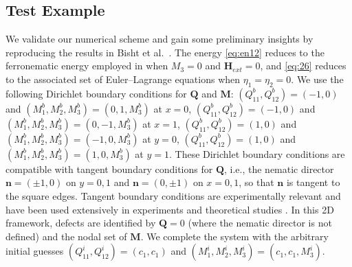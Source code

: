 \documentclass{article}
\def\Qvec{\mathbf{Q}}
\def \Mvec{\mathbf{M}}
\def\nvec{\mathbf{n}}
\def\Hvec{\mathbf{H}}
\begin{document}
\subsection{Test Example}\label{sec:test}

We validate our numerical scheme and gain some preliminary insights by reproducing the results in Bisht et al.\ \cite{Bisht2020}. The energy \eqref{eq:en12} reduces to the ferronematic energy employed in \cite{Bisht2020} when $M_3 = 0$ and $\Hvec_{ext}=0$, 
and \eqref{eq:26} reduces to the associated set of Euler--Lagrange equations when $\eta_1=\eta_2=0$.
We use the following Dirichlet boundary conditions for $\Qvec$ and $\Mvec$: $\left(Q^b_{11}, Q^b_{12}\right)=\left(-1, 0\right)$ and $\left(M^b_{1}, M^b_{2}, M^b_{3}\right)=\left(0, 1, M^b_{3}\right)$ at $x=0$, $\left(Q^b_{11}, Q^b_{12}\right)=\left(-1, 0\right)$ and $\left(M^b_{1}, M^b_{2}, M^b_{3}\right)=\left(0, -1, M^b_{3}\right)$ at $x=1$, $\left(Q^b_{11}, Q^b_{12}\right)=\left(1, 0\right)$ and $\left(M^b_{1}, M^b_{2}, M^b_{3}\right)=\left(-1, 0, M^b_{3}\right)$ at $y=0$, $\left(Q^b_{11}, Q^b_{12}\right)=\left(1, 0\right)$ and $\left(M^b_{1}, M^b_{2}, M^b_{3}\right)=\left(1, 0, M^b_{3}\right)$ at $y=1$. These Dirichlet boundary conditions are compatible with tangent boundary conditions for $\Qvec$, i.e., the nematic director $\nvec = (\pm 1, 0)$ on $y=0,1$ and $\nvec = (0, \pm 1)$ on $x=0,1 $, so that $\nvec$ is tangent to the square edges. Tangent boundary conditions are experimentally relevant and have been used extensively in experiments and theoretical studies \cite{luo2012, tsakonas2007}. In this 2D framework, defects are identified by $\Qvec=0$ (where the nematic director is not defined) and the nodal set of $\Mvec$.
We complete the system with the arbitrary initial guesses $\left(Q^i_{11}, Q^i_{12}\right)=\left(c_1, c_1\right)$ and $\left(M^i_{1}, M^i_{2}, M^i_{3}\right)=\left(c_1, c_1, M^i_{3}\right)$.
\end{document}
